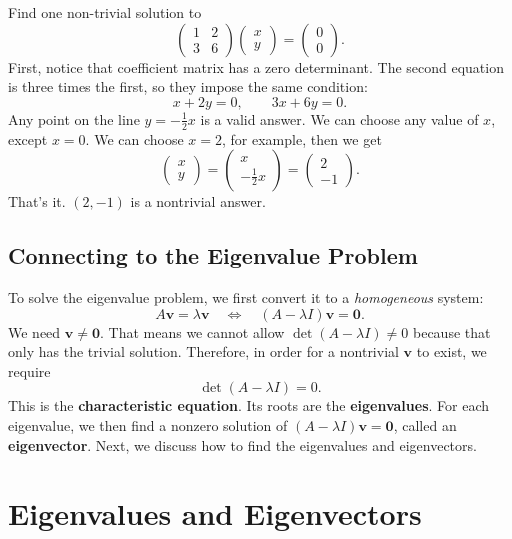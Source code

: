 \documentclass[10pt,letterpaper]{article}
\begin{document}
\begin{example}[0]{    
Find one non-trivial solution to 
\[
\begin{pmatrix}1&2\\3&6\end{pmatrix}
\begin{pmatrix}x\\y\end{pmatrix}=\begin{pmatrix}0\\0\end{pmatrix}.
\]
}
First, notice that coefficient matrix has a zero determinant. The second equation is three times the first, so they impose the same condition:
\[
x+2y=0,\qquad 3x+6y=0.
\]
Any point on the line $y=-\tfrac{1}{2}x$ is a valid answer. We can choose any value of $x$, except $x=0$. We can choose $x=2$, for example, then we get
\[
\begin{pmatrix}
    x\\y
\end{pmatrix}=\begin{pmatrix}
 x\\
 -\tfrac{1}{2}x
\end{pmatrix}
=
\begin{pmatrix}2\\-1\end{pmatrix}.
\]
That's it. $(2,-1)$ is a nontrivial answer.
\end{example}

\subsection{Connecting to the Eigenvalue Problem}
To solve the eigenvalue problem, we first convert it to a \textit{homogeneous} system:
\[
A\mathbf{v}=\lambda\mathbf{v}
\quad\Longleftrightarrow\quad
(A-\lambda I)\mathbf{v}=\mathbf{0}.
\]
We need $\mathbf{v}\ne\mathbf{0}$. That means we cannot allow $\det(A-\lambda I)\ne0$ because that only has the trivial solution. Therefore, in order for a nontrivial $\textbf{v}$ to exist, we require 
\[
\boxed{\det(A-\lambda I)=0.}
\]
This is the \textbf{characteristic equation}. Its roots are the
\textbf{eigenvalues}. For each eigenvalue, we then find a nonzero
solution of $(A-\lambda I)\mathbf{v}=\mathbf{0}$, called an
\textbf{eigenvector}. Next, we discuss how to find the eigenvalues and eigenvectors.

\section{Eigenvalues and Eigenvectors}
\end{document}
